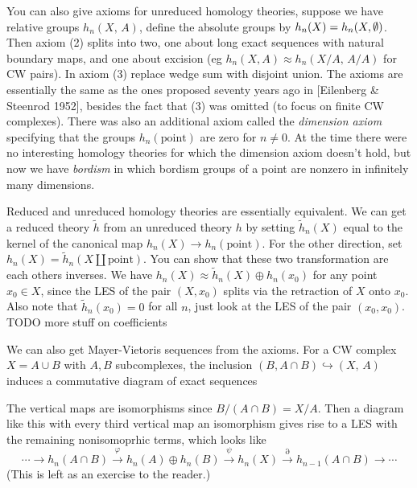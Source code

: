 You can also give axioms for unreduced homology theories, suppose we have relative groups $h_n (X,\,A)  $, define the absolute groups by $h_n (X)=h_n (X,\emptyset)$. Then axiom (2) splits into two, one about long exact sequences with natural boundary maps, and one about excision (eg $h_n (X,A) \approx h_n (X /A,\, A /A)$ for CW pairs). In axiom (3) replace wedge sum with disjoint union. The axioms are essentially the same as the ones proposed seventy years ago in [Eilenberg \& Steenrod 1952], besides the fact that (3) was omitted (to focus on finite CW complexes). There was also an additional axiom called the \emph{dimension axiom} specifying that the groups $h_n (\text{point} )$ are zero for $n\neq 0$. At the time there were no interesting homology theories for which the dimension axiom doesn't hold, but now we have \emph{bordism} in which bordism groups of a point are nonzero in infinitely many dimensions. 

Reduced and unreduced homology theories are essentially equivalent. We can get a reduced theory $\widetilde h$ from an unreduced theory $h$ by setting $\widetilde h_n (X)$ equal to the kernel of the canonical map $h_n (X)\to h_n (\text{point} )$. For the other direction, set $h_n (X)=\widetilde h_n (X\amalg \text{point} )$. You can show that these two transformation are each others inverses. We have $h_n (X)\approx \widetilde h_n (X)\oplus h_n (x_0)$ for any point $x_0\in X$, since the LES of the pair $(X,x_0)$ splits via the retraction of $X$ onto $x_0$. Also note that $\widetilde h_n (x_0)=0$ for all $n$, just look at the LES of the pair $(x_0,x_0)$.
TODO more stuff on coefficients

We can also get Mayer-Vietoris sequences from the axioms. For a CW complex $X=A\cup B$ with $A,B$ subcomplexes, the inclusion $(B,A\cap B)\hookrightarrow (X,\,A)$ induces a commutative diagram of exact sequences 
\begin{figure}[H]
\centering
{}
\end{figure}
The vertical maps are isomorphisms since $B /(A\cap B)=X /A$. Then a diagram like this with every third vertical map an isomorphism gives rise to a LES with the remaining nonisomoprhic terms, which looks like \[
    \cdots \to h_n (A\cap B) \overset{\varphi }{\longrightarrow} h_n (A)\oplus h_n (B) \overset{\psi }{\longrightarrow} h_n (X)\overset{\partial }{\longrightarrow} h_{n-1}(A\cap B)\to \cdots 
\] (This is left as an exercise to the reader.)

